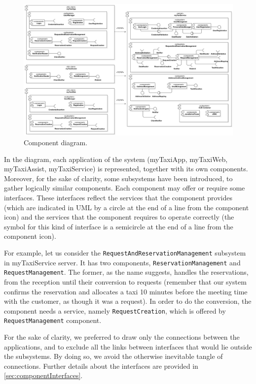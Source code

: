 \begin{figure}%
	\centering%
	\includegraphics[width=\linewidth]{img/ComponentView__ComponentDiagram_1}%
	\caption{Component diagram.}\label{fig:component}%
\end{figure}

In the diagram, each application of the system (myTaxiApp, myTaxiWeb, myTaxiAssist, myTaxiService) is represented, together with its own components. Moreover, for the sake of clarity, some subsystems have been introduced, to gather logically similar components. Each component may offer or require some interfaces. These interfaces reflect the services that the component provides (which are indicated in UML by a circle at the end of a line from the component icon) and the services that the component requires to operate correctly (the symbol for this kind of interface is a semicircle at the end of a line from the component icon).

For example, let us consider the \texttt{Re\-quest\-And\-Res\-er\-va\-tion\-Man\-age\-ment} subsystem in myTaxiService server. It has two components, \texttt{Res\-er\-va\-tion\-Man\-age\-ment} and \texttt{Re\-quest\-Man\-age\-ment}. The former, as the name suggests, handles the reservations, from the reception until their conversion to requests (remember that our system confirms the reservation and allocates a taxi \num{10} minutes before the meeting time with the customer, as though it was a request). In order to do the conversion, the component needs a service, namely \texttt{Re\-quest\-Cre\-ation}, which is offered by \texttt{Re\-quest\-Man\-age\-ment} component.

For the sake of clarity, we preferred to draw only the connections between the applications, and to exclude all the links between interfaces that would lie outside the subsystems. By doing so, we avoid the otherwise inevitable tangle of connections. Further details about the interfaces are provided in \cref{sec:componentInterfaces}.

